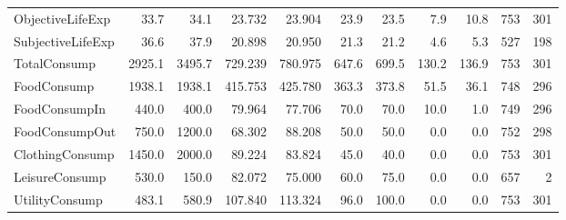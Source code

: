 \begin{table}
\begin{tabular}[t]{lrrrrrrrrrr}
\addlinespace
ObjectiveLifeExp & 33.7 & 34.1 & 23.732 & 23.904 & 23.9 & 23.5 & 7.9 & 10.8 & 753 & 301\\
SubjectiveLifeExp & 36.6 & 37.9 & 20.898 & 20.950 & 21.3 & 21.2 & 4.6 & 5.3 & 527 & 198\\
TotalConsump & 2925.1 & 3495.7 & 729.239 & 780.975 & 647.6 & 699.5 & 130.2 & 136.9 & 753 & 301\\
FoodConsump & 1938.1 & 1938.1 & 415.753 & 425.780 & 363.3 & 373.8 & 51.5 & 36.1 & 748 & 296\\
FoodConsumpIn & 440.0 & 400.0 & 79.964 & 77.706 & 70.0 & 70.0 & 10.0 & 1.0 & 749 & 296\\
\addlinespace
FoodConsumpOut & 750.0 & 1200.0 & 68.302 & 88.208 & 50.0 & 50.0 & 0.0 & 0.0 & 752 & 298\\
ClothingConsump & 1450.0 & 2000.0 & 89.224 & 83.824 & 45.0 & 40.0 & 0.0 & 0.0 & 753 & 301\\
LeisureConsump & 530.0 & 150.0 & 82.072 & 75.000 & 60.0 & 75.0 & 0.0 & 0.0 & 657 & 2\\
UtilityConsump & 483.1 & 580.9 & 107.840 & 113.324 & 96.0 & 100.0 & 0.0 & 0.0 & 753 & 301\\
\bottomrule
\end{tabular}
\end{table}
